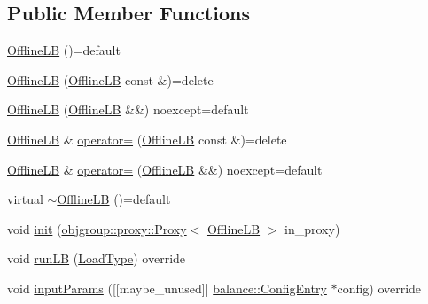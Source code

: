 \subsection*{Public Member Functions}
\begin{DoxyCompactItemize}
\item 
\hyperlink{structvt_1_1vrt_1_1collection_1_1lb_1_1_offline_l_b_a99528b3cbbb7cf3a3ffe298dd7f8b98a}{Offline\+LB} ()=default
\item 
\hyperlink{structvt_1_1vrt_1_1collection_1_1lb_1_1_offline_l_b_afb45e5b5adb6761c53877de9c4e7e4b1}{Offline\+LB} (\hyperlink{structvt_1_1vrt_1_1collection_1_1lb_1_1_offline_l_b}{Offline\+LB} const \&)=delete
\item 
\hyperlink{structvt_1_1vrt_1_1collection_1_1lb_1_1_offline_l_b_a26accbf7d8c123dc9594e64ec7eb8161}{Offline\+LB} (\hyperlink{structvt_1_1vrt_1_1collection_1_1lb_1_1_offline_l_b}{Offline\+LB} \&\&) noexcept=default
\item 
\hyperlink{structvt_1_1vrt_1_1collection_1_1lb_1_1_offline_l_b}{Offline\+LB} \& \hyperlink{structvt_1_1vrt_1_1collection_1_1lb_1_1_offline_l_b_a94affec36f4542b31b67748b17f577bb}{operator=} (\hyperlink{structvt_1_1vrt_1_1collection_1_1lb_1_1_offline_l_b}{Offline\+LB} const \&)=delete
\item 
\hyperlink{structvt_1_1vrt_1_1collection_1_1lb_1_1_offline_l_b}{Offline\+LB} \& \hyperlink{structvt_1_1vrt_1_1collection_1_1lb_1_1_offline_l_b_a2d6408b68d2f1eb5b59d78715e0915d5}{operator=} (\hyperlink{structvt_1_1vrt_1_1collection_1_1lb_1_1_offline_l_b}{Offline\+LB} \&\&) noexcept=default
\item 
virtual \hyperlink{structvt_1_1vrt_1_1collection_1_1lb_1_1_offline_l_b_a72e0da5f0731ce6290d8bbcc505e4d7a}{$\sim$\+Offline\+LB} ()=default
\item 
void \hyperlink{structvt_1_1vrt_1_1collection_1_1lb_1_1_offline_l_b_a872df3cf9b5018b990ef9029f7bf9110}{init} (\hyperlink{structvt_1_1objgroup_1_1proxy_1_1_proxy}{objgroup\+::proxy\+::\+Proxy}$<$ \hyperlink{structvt_1_1vrt_1_1collection_1_1lb_1_1_offline_l_b}{Offline\+LB} $>$ in\+\_\+proxy)
\item 
void \hyperlink{structvt_1_1vrt_1_1collection_1_1lb_1_1_offline_l_b_ad6b473ed506c50b86e308fc9840a11d7}{run\+LB} (\hyperlink{namespacevt_a8fb51741340b87d7aaee0bef60e9896b}{Load\+Type}) override
\item 
void \hyperlink{structvt_1_1vrt_1_1collection_1_1lb_1_1_offline_l_b_a3d446001da6cdd41852906f3dcca26c7}{input\+Params} (\mbox{[}\mbox{[}maybe\+\_\+unused\mbox{]}\mbox{]} \hyperlink{structvt_1_1vrt_1_1collection_1_1balance_1_1_config_entry}{balance\+::\+Config\+Entry} $\ast$config) override
\end{DoxyCompactItemize}
